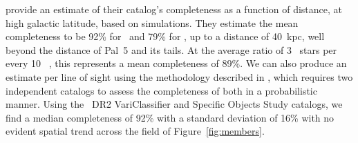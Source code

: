 \documentclass[twocolumn]{aastex63}
\begin{document}
\citet{Sesar:2017b} provide an estimate of their catalog's completeness as a function of distance, at high galactic latitude, based on simulations. They estimate the mean completeness to be 92\% for \rrab~and 79\% for \rrc, up to a distance of 40~kpc, well beyond the distance of Pal~5 and its tails. At the average ratio of 3 \rrc~stars per every 10 \rrab~\citep{Layden1995}, this represents a mean completeness of 89\%. We can also produce an estimate per line of sight using the methodology described in \citet{Rybizki2018}, which requires two independent catalogs to assess the completeness of both in a probabilistic manner. Using the \Gaia~DR2 VariClassifier \citet{Holl2018,Rimoldini2018} and Specific Objects Study \citep{Clementini2018} catalogs, we find a median completeness of 92\% with a standard deviation of 16\%  with no evident spatial trend across the field of Figure~\ref{fig:members}.


\end{document}
